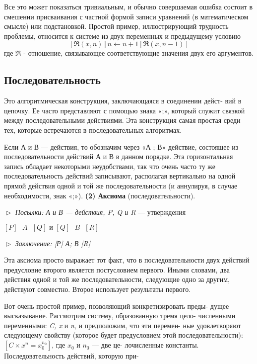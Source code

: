 Все  это  может  показаться  тривиальным,  и  обычно  совершаемая 
ошибка  состоит  в  смешении  присваивания с  частной  формой  записи 
уравнений (в математическом смысле)  или подстановкой. Простой при­мер,  иллюстрирующий  трудность  проблемы,  относится  к  системе  из 
двух переменных  и  предыдущему  условию
\begin{equation*}
\textit{$[\Re(x,n)] n \leftarrow n + 1 [\Re(x,n - 1)]$}
	\end{equation*}
где $\Re$ - отношение,  связывающее соответствующие значения двух его 
аргументов.
\subsection{Последовательность}
\noindent Это  алгоритмическая конструкция,  заключающаяся  в соединении дей­ст-
вий  в цепочку.  Ее часто представляют с помощью знака «;», который 
служит связкой  между  последовательными  действиями.  Эта конструк­ция
 самая простая среди тех, которые встречаются в последовательных 
алгоритмах.

Если А и В — действия,  то обозначим  через  «А ; В» действие, 
со­стоящее из последовательности действий А и В в данном порядке. Эта 
горизонтальная запись обладает некоторыми неудобствами, так что 
очень часто ту же последовательность действий записывают, распола­гая
вертикально на одной прямой действия одной и той же последова­тельности
(и аннулируя, в случае необходимости, знак «;»).
\newline
\textbf{(2) Аксиома} (последовательности).
\newline

\noindent $\vartriangleright$ \textit{Посылки: А и В --- действия, P, Q и R} --- утверждения
\begin{center}
\textit{$[ P ]\textit{ }A\textit{ }[ Q ]  \text{ и } [Q]\textit{ }B\textit{ }[ R ]$}
\end{center}
\pagebreak
$\vartriangleright$ \textit{Заключение:  [Р] А; В [R]}
\newline

Эта  аксиома  просто  выражает  тот  факт,  что  в  последовательно­сти 
двух действий  предусловие  второго является  постусловием  перво­го.
Иными словами, два действия одной и той же последовательности, 
следующие  одно за другим,  действуют  совместно.  Второе  использует 
результаты первого.

Вот очень простой пример, позволяющий конкретизировать преды-\linebreak
дущее  высказывание.  Рассмотрим систему,  образованную тремя цело­-\linebreak
численными переменными: \textit{C, x} и \textit{n}, и предположим, что эти перемен­-\linebreak
ные удовлетворяют следующему свойству (которое будет предусловием \linebreak
этой последовательности):\textit{$[C\times x^{n} = x_{0}^{n_{0}}]$}, где \textit{$x_{0}$} и \textit{$n_{0}$} --- две це-\linebreak
лочисленные константы. Последовательность действий, которую при­-

